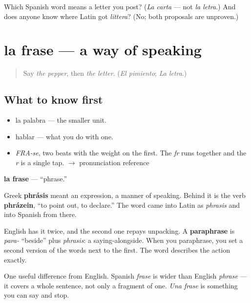 \begin{tcolorbox}[breakable,colback=teal!4,colframe=teal!35!black,title={Before you move on}]
Which Spanish word means a letter you post? (\emph{La carta} — not \emph{la letra}.) And does anyone know where Latin got \emph{littera}? (No; both proposals are unproven.)
\end{tcolorbox}
\section[la frase]{la frase — a way of speaking}

\label{lesson:ES-C377-frase}



\begin{quote}
Say \emph{the pepper}, then \emph{the letter}. (\emph{El pimiento}; \emph{La letra}.)
\end{quote}

\subsection*{What to know first}
\begin{itemize}
\raggedright
  \item la palabra — the smaller unit.
  \item hablar — what you do with one.
\end{itemize}

\begin{sounds}
\begin{itemize}
\raggedright
  \item \emph{FRA-se}, two beats with the weight on the first. The \emph{fr} runs together and the \emph{r} is a single tap. $\to$ pronunciation reference
\end{itemize}
\end{sounds}

\begin{cousinweb}
\textbf{la frase} — \textquotedblleft{}phrase.\textquotedblright{}

Greek \textbf{phrásis} meant an expression, a manner of speaking. Behind it is the verb \textbf{phrázein}, \textquotedblleft{}to point out, to declare.\textquotedblright{} The word came into Latin as \emph{phrasis} and into Spanish from there.

English has it twice, and the second one repays unpacking. A \textbf{paraphrase} is \emph{para-} \textquotedblleft{}beside\textquotedblright{} plus \emph{phrasis}: a saying-alongside. When you paraphrase, you set a second version of the words next to the first. The word describes the action exactly.

One useful difference from English. Spanish \emph{frase} is wider than English \emph{phrase} — it covers a whole sentence, not only a fragment of one. \emph{Una frase} is something you can say and stop.
\end{cousinweb}

